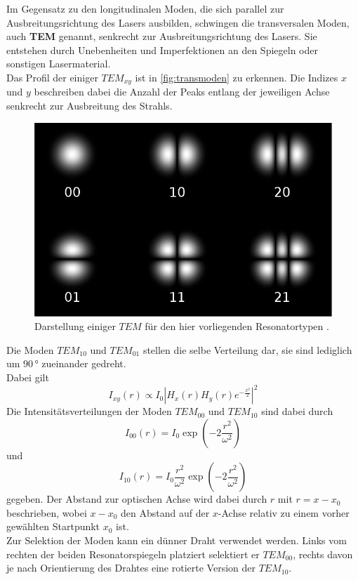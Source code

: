 Im Gegensatz zu den longitudinalen Moden, die sich parallel zur Ausbreitungsrichtung des Lasers ausbilden, schwingen die transversalen Moden, auch \textbf{TEM} genannt, senkrecht zur Ausbreitungsrichtung des Lasers.
Sie entstehen durch Unebenheiten und Imperfektionen an den Spiegeln oder sonstigen Lasermaterial. \\
Das Profil der einiger $TEM_{x y}$ ist in \autoref{fig:transmoden} zu erkennen.
Die Indizes $x$ und $y$ beschreiben dabei die Anzahl der Peaks entlang der jeweiligen Achse senkrecht zur Ausbreitung des Strahls.

\begin{figure}[H]
    \centering
    \includegraphics[width=.5\textwidth]{figures/TransversaleModen.pdf}
    \caption{Darstellung einiger $TEM$ für den hier vorliegenden Resonatortypen \cite{transmode}.}
    \label{fig:transmoden}
\end{figure}

Die Moden $TEM_{10}$ und $TEM_{01}$ stellen die selbe Verteilung dar, sie sind lediglich um $90 \,°$ zueinander gedreht. \\
Dabei gilt
\begin{equation*}
    I_{xy} (r) \propto I_0 \left| H_x(r) H_y(r) e^{-\frac{x^2}{2}} \right|^2 
\end{equation*}
Die Intensitätsverteilungen der Moden $TEM_{00}$ und $TEM_{10}$ sind dabei durch
\begin{equation}
    I_{00} (r) = I_0 \exp \left(-2\frac{r^2}{\omega^2} \right)
    \label{eq:int00}
\end{equation}
und
\begin{equation}
    I_{10} (r) = I_0 \frac{r^2}{\omega^2} \exp \left(-2\frac{r^2}{\omega^2}\right)
    \label{eq:int10}
\end{equation}
gegeben.
Der Abstand zur optischen Achse wird dabei durch $r$ mit $r = x - x_0$ beschrieben, wobei $x - x_0$ den Abstand auf der $x$-Achse relativ zu einem vorher gewählten Startpunkt $x_0$ ist. \\

Zur Selektion der Moden kann ein dünner Draht verwendet werden.
Links vom rechten der beiden Resonatorspiegeln platziert selektiert er $TEM_{00}$, rechts davon je nach Orientierung des Drahtes eine rotierte Version der $TEM_{10}$. \\

